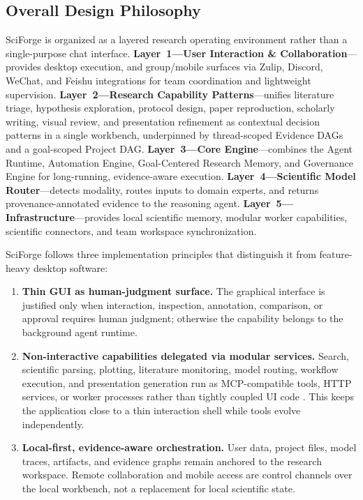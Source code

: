 \documentclass[sn-basic,Numbered,pdflatex]{sn-jnl}
\begin{document}
\subsection{Overall Design Philosophy}

SciForge is organized as a layered research operating environment rather than a single-purpose chat interface. \textbf{Layer~1---User Interaction \& Collaboration}---provides desktop execution, and group/mobile surfaces via Zulip, Discord, WeChat, and Feishu integrations for team coordination and lightweight supervision. \textbf{Layer~2---Research Capability Patterns}---unifies literature triage, hypothesis exploration, protocol design, paper reproduction, scholarly writing, visual review, and presentation refinement as contextual decision patterns in a single workbench, underpinned by thread-scoped Evidence DAGs and a goal-scoped Project DAG. \textbf{Layer~3---Core Engine}---combines the Agent Runtime, Automation Engine, Goal-Centered Research Memory, and Governance Engine for long-running, evidence-aware execution. \textbf{Layer~4---Scientific Model Router}---detects modality, routes inputs to domain experts, and returns provenance-annotated evidence to the reasoning agent. \textbf{Layer~5---Infrastructure}---provides local scientific memory, modular worker capabilities, scientific connectors, and team workspace synchronization.

SciForge follows three implementation principles that distinguish it from feature-heavy desktop software:

\begin{enumerate}
    \item \textbf{Thin GUI as human-judgment surface.} The graphical interface is justified only when interaction, inspection, annotation, comparison, or approval requires human judgment; otherwise the capability belongs to the background agent runtime.
    \item \textbf{Non-interactive capabilities delegated via modular services.} Search, scientific parsing, plotting, literature monitoring, model routing, workflow execution, and presentation generation run as MCP-compatible tools, HTTP services, or worker processes rather than tightly coupled UI code \cite{anthropicMCP2024}. This keeps the application close to a thin interaction shell while tools evolve independently.
    \item \textbf{Local-first, evidence-aware orchestration.} User data, project files, model traces, artifacts, and evidence graphs remain anchored to the research workspace. Remote collaboration and mobile access are control channels over the local workbench, not a replacement for local scientific state.
\end{enumerate}
\end{document}
